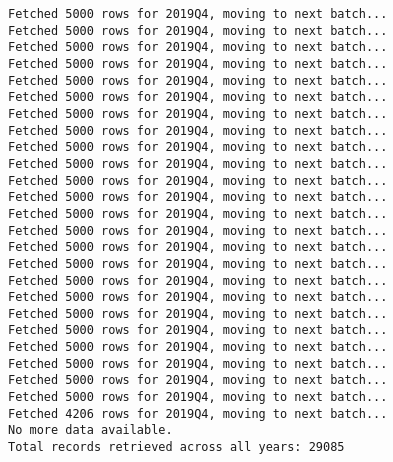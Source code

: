 \documentclass[
  letterpaper,
  DIV=11,
  numbers=noendperiod]{scrartcl}
\begin{document}
\begin{verbatim}
Fetched 5000 rows for 2019Q4, moving to next batch...
Fetched 5000 rows for 2019Q4, moving to next batch...
Fetched 5000 rows for 2019Q4, moving to next batch...
Fetched 5000 rows for 2019Q4, moving to next batch...
Fetched 5000 rows for 2019Q4, moving to next batch...
Fetched 5000 rows for 2019Q4, moving to next batch...
Fetched 5000 rows for 2019Q4, moving to next batch...
Fetched 5000 rows for 2019Q4, moving to next batch...
Fetched 5000 rows for 2019Q4, moving to next batch...
Fetched 5000 rows for 2019Q4, moving to next batch...
Fetched 5000 rows for 2019Q4, moving to next batch...
Fetched 5000 rows for 2019Q4, moving to next batch...
Fetched 5000 rows for 2019Q4, moving to next batch...
Fetched 5000 rows for 2019Q4, moving to next batch...
Fetched 5000 rows for 2019Q4, moving to next batch...
Fetched 5000 rows for 2019Q4, moving to next batch...
Fetched 5000 rows for 2019Q4, moving to next batch...
Fetched 5000 rows for 2019Q4, moving to next batch...
Fetched 5000 rows for 2019Q4, moving to next batch...
Fetched 5000 rows for 2019Q4, moving to next batch...
Fetched 5000 rows for 2019Q4, moving to next batch...
Fetched 5000 rows for 2019Q4, moving to next batch...
Fetched 5000 rows for 2019Q4, moving to next batch...
Fetched 5000 rows for 2019Q4, moving to next batch...
Fetched 4206 rows for 2019Q4, moving to next batch...
No more data available.
Total records retrieved across all years: 29085
\end{verbatim}
\end{document}
